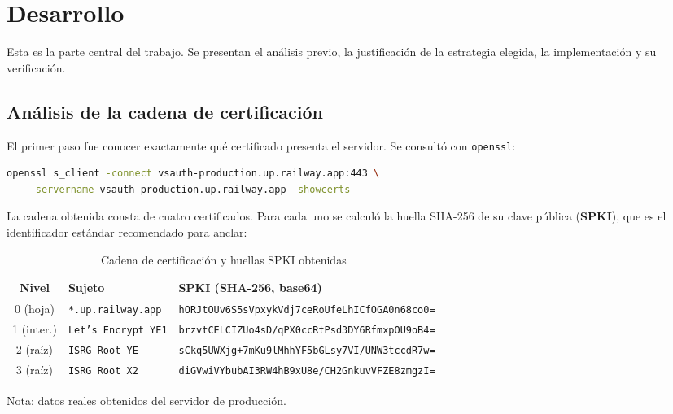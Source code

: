 \documentclass[12pt, a4paper]{article} %
\begin{document}
\section{Desarrollo}
\label{sec:desarrollo}
Esta es la parte central del trabajo. Se presentan el análisis previo, la
justificación de la estrategia elegida, la implementación y su verificación.

\subsection{Análisis de la cadena de certificación}
\label{sec:cadena}
El primer paso fue conocer exactamente qué certificado presenta el servidor.
Se consultó con \texttt{openssl}:

\begin{lstlisting}[language=bash, caption={Extracción de la cadena de certificación}]
openssl s_client -connect vsauth-production.up.railway.app:443 \
    -servername vsauth-production.up.railway.app -showcerts
\end{lstlisting}

La cadena obtenida consta de cuatro certificados. Para cada uno se calculó la
huella SHA-256 de su clave pública (\textbf{SPKI}), que es el identificador
estándar recomendado para anclar:

\begin{table}[h]
    \centering
    \caption{Cadena de certificación y huellas SPKI obtenidas}
    \label{tab:cadena}
    \begin{tabular}{clp{5.2cm}}
        \toprule
        \textbf{Nivel} & \textbf{Sujeto} & \textbf{SPKI (SHA-256, base64)} \\
        \midrule
        0 (hoja)  & \texttt{*.up.railway.app}   & \texttt{\scriptsize hORJtOUv6S5sVpxykVdj7ceRoUfeLhICfOGA0n68co0=} \\
        1 (inter.)& \texttt{Let's Encrypt YE1}  & \texttt{\scriptsize brzvtCELCIZUo4sD/qPX0ccRtPsd3DY6RfmxpOU9oB4=} \\
        2 (raíz)  & \texttt{ISRG Root YE}       & \texttt{\scriptsize sCkq5UWXjg+7mKu9lMhhYF5bGLsy7VI/UNW3tccdR7w=} \\
        3 (raíz)  & \texttt{ISRG Root X2}       & \texttt{\scriptsize diGVwiVYbubAI3RW4hB9xU8e/CH2GnkuvVFZE8zmgzI=} \\
        \bottomrule
    \end{tabular}
    \vspace{0.5em}
    \footnotesize Nota: datos reales obtenidos del servidor de producción.
\end{table}
\end{document}
